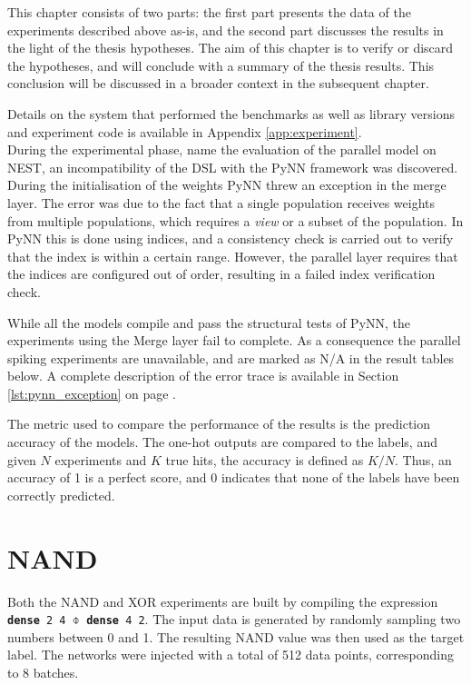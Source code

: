 \documentclass[report.tex]{subfiles}
\begin{document}
This chapter consists of two parts:
the first part presents the data of the experiments described above as-is,
and the second part discusses the results in the light of the thesis hypotheses.
The aim of this chapter is to verify or discard the hypotheses, and will
conclude with a summary of the thesis results.
This conclusion will be discussed in a broader context in the subsequent chapter.

Details on the system that performed the benchmarks as well as
library versions and experiment code is available in Appendix
\ref{app:experiment}.
\\[0.1cm]

During the experimental phase, name the evaluation of the parallel model on
NEST, an incompatibility of the DSL with the PyNN framework was discovered.
During the initialisation of the weights PyNN threw an exception in the 
merge layer.
The error was due to the fact that a single population receives weights
from multiple populations, which requires a \textit{view} or a subset of the
population. 
In PyNN this is done using indices, and a consistency check is carried out to
verify that the index is within a certain range.
However, the parallel layer requires that the indices are configured out of
order, resulting in a failed index verification check.

While all the models compile and pass the structural tests of PyNN,
the experiments using the Merge layer fail to complete.
As a consequence the parallel spiking experiments are unavailable, and are
marked as N/A in the result tables below.
A complete description of the error trace is available in Section
\ref{lst:pynn_exception} on page \pageref{lst:pynn_exception}.

The metric used to compare the performance of the results is the prediction
accuracy of the models. 
The one-hot outputs are compared to the labels, and given $N$ experiments and
$K$ true hits, the accuracy is defined as $K / N$.
Thus, an accuracy of 1 is a perfect score, and 0 indicates that none of the
labels have been correctly predicted.

\section{NAND}
Both the NAND and XOR experiments are built by compiling the expression 
\texttt{\textbf{dense} 2 4 $\obar$ \textbf{dense} 4 2}.
The input data is generated by randomly sampling two numbers between 0 and 1.
The resulting NAND value was then used as the target label.
The networks were injected with a total of 512 data points, corresponding to 8
batches.
\end{document}
